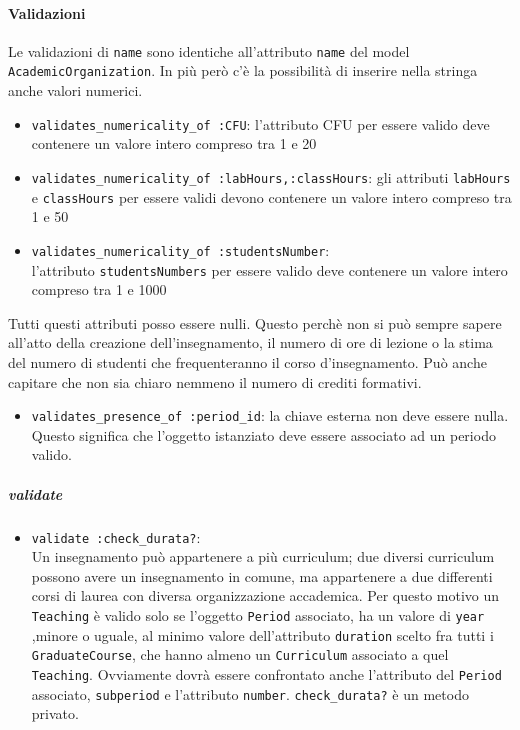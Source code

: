 \documentclass[11pt,a4paper]{article}
\begin{document}
\paragraph{Validazioni}
Le validazioni di \verb|name| sono identiche all'attributo \verb|name| del model \verb|AcademicOrganization|. In più però c'è la possibilità di inserire nella stringa anche valori numerici.
\begin{itemize}
 \item \verb|validates_numericality_of :CFU|: l'attributo CFU per essere valido deve contenere un valore intero compreso tra 1 e 20
 \item \verb|validates_numericality_of :labHours,:classHours|: gli attributi \verb|labHours| e \verb|classHours| per essere validi devono contenere un valore intero compreso tra 1 e 50
\item \verb|validates_numericality_of :studentsNumber|:\\ l'attributo \verb|studentsNumbers| per essere valido deve contenere un valore intero compreso tra 1 e 1000
\end{itemize}
Tutti questi attributi posso essere nulli. Questo perchè non si può sempre sapere all'atto della creazione dell'insegnamento, il numero di ore di lezione o la stima del numero di studenti che frequenteranno il corso d'insegnamento. Può anche capitare che non sia chiaro nemmeno il numero di crediti formativi.
\begin{itemize}
 \item \verb|validates_presence_of :period_id|: la chiave esterna non deve essere nulla. Questo significa che l'oggetto istanziato deve essere associato ad un periodo valido.
\end{itemize}

\subparagraph{validate}
\begin{itemize}
\item \verb|validate :check_durata?|:\\ Un insegnamento può appartenere a più curriculum; due diversi curriculum possono avere un insegnamento in comune, ma appartenere a due differenti corsi di laurea con diversa organizzazione accademica.
Per questo motivo un \verb|Teaching| è valido solo se l'oggetto \verb|Period| associato, ha un valore di \verb|year| ,minore o uguale, al minimo valore dell'attributo \verb|duration| scelto fra tutti i \verb|GraduateCourse|, che hanno almeno un \verb|Curriculum| associato a quel \verb|Teaching|. Ovviamente dovrà essere confrontato anche l'attributo del \verb|Period| associato, \verb|subperiod| e l'attributo \verb|number|.
 \verb|check_durata?| è un metodo privato.
\end{itemize}
\end{document}
